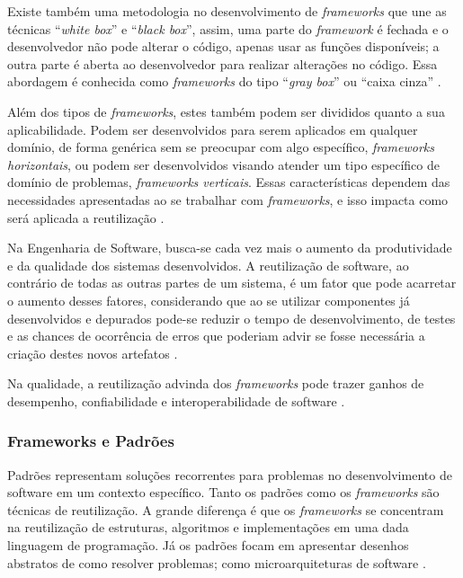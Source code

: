 Existe também uma metodologia no desenvolvimento de \textit{frameworks} que une as técnicas ``\textit{white box}'' e ``\textit{black box}'', assim, uma parte do \textit{framework} é fechada e o desenvolvedor não pode alterar o código, apenas usar as funções disponíveis; a outra parte é aberta ao desenvolvedor para realizar alterações no código. Essa abordagem é conhecida como \textit{frameworks} do tipo ``\textit{gray box}'' ou ``caixa cinza'' \cite{Kristensen:2004}.

Além dos tipos de \textit{frameworks}, estes também podem ser divididos quanto a sua aplicabilidade. Podem ser desenvolvidos para serem aplicados em qualquer domínio, de forma genérica sem se preocupar com algo específico, \textit{frameworks horizontais}, ou podem ser desenvolvidos visando atender um tipo específico de domínio de problemas, \textit{frameworks verticais}. Essas características dependem das necessidades apresentadas ao se trabalhar com \textit{frameworks}, e isso impacta como será aplicada a reutilização \cite{Kroth:2000}.

Na Engenharia de Software, busca-se cada vez mais o aumento da produtividade e da qualidade dos sistemas desenvolvidos. A reutilização de software, ao contrário de todas as outras partes de um sistema, é um fator que pode acarretar o aumento desses fatores, considerando que ao se utilizar componentes já desenvolvidos e depurados pode-se reduzir o tempo de desenvolvimento, de testes e as chances de ocorrência de erros que poderiam advir se fosse necessária a criação destes novos artefatos \cite{Silva:2000}.

Na qualidade, a reutilização advinda dos \textit{frameworks} pode trazer ganhos de desempenho, confiabilidade e interoperabilidade de software \cite{Fayad:Schimidt:1997}.

\subsubsection{Frameworks e Padrões}

Padrões representam soluções recorrentes para problemas no desenvolvimento de software em um contexto específico. Tanto os padrões como os \textit{frameworks} são técnicas de reutilização. A grande diferença é que os \textit{frameworks} 	se concentram na reutilização de estruturas, algoritmos e implementações em uma dada linguagem de programação. Já os padrões focam em apresentar desenhos abstratos de como resolver problemas; como microarquiteturas de software \cite{Fayad:Schimidt:1997}.

